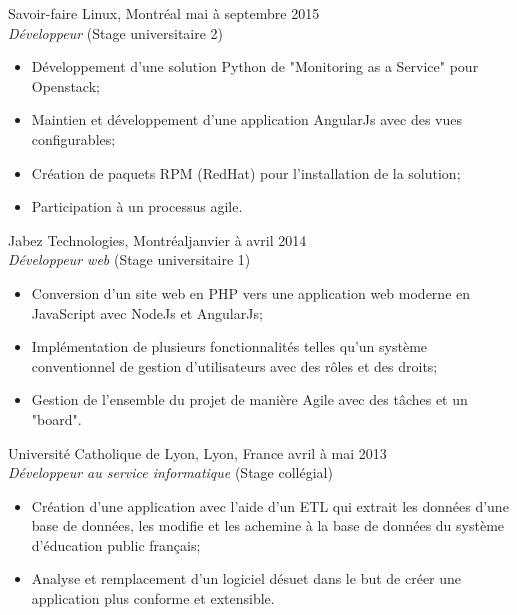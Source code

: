 \documentclass{res}
\begin{document}
\begin{resume}
{	%
	Savoir-faire Linux, Montréal
	\hfill mai à septembre 2015 \\
	{\sl Développeur} \hfill (Stage universitaire 2)
	\vspace{0.05in}

	\begin{itemize} \itemsep -2pt
		\item Développement d'une solution Python de "Monitoring as a Service" pour Openstack;
		\item Maintien et développement d'une application AngularJs avec des vues configurables;
		\item Création de paquets RPM (RedHat) pour l'installation de la solution;
		\item Participation à un processus agile.
	\end{itemize}

	Jabez Technologies, Montréal\footnotemark[\value{footnote}]
	\hfill janvier à avril 2014 \\
	{\sl Développeur web} \hfill (Stage universitaire 1)
	\vspace{0.05in}

	\begin{itemize} \itemsep -2pt
		\item Conversion d’un site web en PHP vers une application web moderne en JavaScript avec NodeJs et AngularJs;
		\item Implémentation de plusieurs fonctionnalités telles qu’un système conventionnel de gestion d’utilisateurs avec des rôles et des droits;
		\item Gestion de l’ensemble du projet de manière Agile avec des tâches et un "board".
	\end{itemize}

	Université Catholique de Lyon, Lyon, France
	\hfill avril à mai 2013 \\
	{\sl Développeur au service informatique} \hfill (Stage collégial)
	\vspace{0.05in}

	\begin{itemize} \itemsep -2pt
		\item Création d’une application avec l’aide d’un ETL qui extrait les données d’une base de données, les modifie et les achemine à la base de données du système d’éducation public français;
		\item Analyse et remplacement d’un logiciel désuet dans le but de créer une application plus conforme et extensible.
	\end{itemize}

}
\end{resume}
\end{document}

